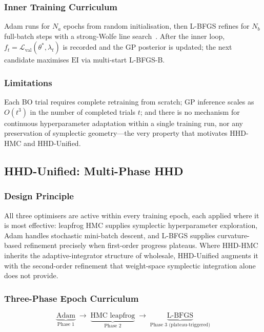 \documentclass[11pt]{article}
\theoremstyle{definition}
\newcommand{\calL}{\mathcal{L}}
\newcommand{\EI}{\mathrm{EI}}
\begin{document}
\subsubsection{Inner Training Curriculum}

Adam runs for $N_a$ epochs from random initialisation, then L-BFGS
refines for $N_b$ full-batch steps with a strong-Wolfe line
search~\cite{wolfe1969}. After the inner loop,
$f_t=\calL_{\mathrm{val}}(\theta^*,\lambda_t)$ is recorded and the GP
posterior is updated; the next candidate maximises $\EI$ via
multi-start L-BFGS-B.

\subsubsection{Limitations}

Each BO trial requires complete retraining from scratch; GP
inference scales as $O(t^3)$ in the number of completed trials $t$;
and there is no mechanism for continuous hyperparameter adaptation
within a single training run, nor any preservation of symplectic
geometry---the very property that motivates HHD-HMC and HHD-Unified.

\subsection{HHD-Unified: Multi-Phase HHD}

\subsubsection{Design Principle}

All three optimisers are active within every training epoch, each
applied where it is most effective: leapfrog HMC supplies symplectic
hyperparameter exploration, Adam handles stochastic mini-batch
descent, and L-BFGS supplies curvature-based refinement precisely
when first-order progress plateaus. Where HHD-HMC inherits the
adaptive-integrator structure of \cite{duruisseaux2021adaptive}
wholesale, HHD-Unified augments it with the second-order refinement that
weight-space symplectic integration alone does not provide.

\subsubsection{Three-Phase Epoch Curriculum}

\begin{equation}
\underbrace{\text{Adam}}_{\text{Phase 1}}
\;\longrightarrow\;
\underbrace{\text{HMC leapfrog}}_{\text{Phase 2}}
\;\longrightarrow\;
\underbrace{\text{L-BFGS}}_{\text{Phase 3 (plateau-triggered)}}
\label{eq:curriculum}
\end{equation}
\end{document}
